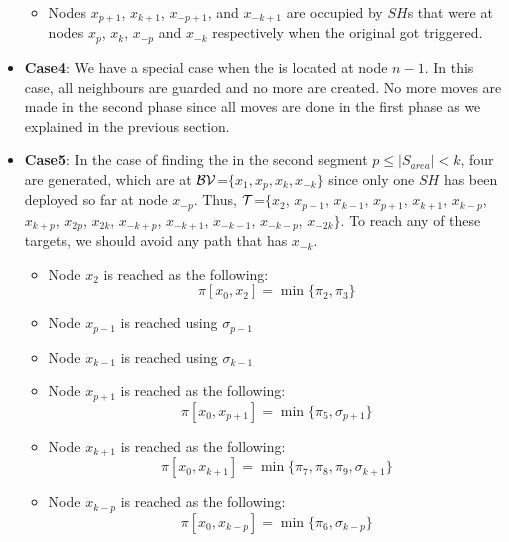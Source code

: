\begin{itemize}
\begin{itemize}
\item Nodes $x_{p+1}$, $x_{k+1}$, $x_{-p+1}$, and $x_{-k+1}$ are occupied by $SH$s that were at nodes $x_{p}$, $x_{k}$, $x_{-p}$ and $x_{-k}$ respectively when the original \bv got triggered. 
\end{itemize}


\item {\bf Case4}: We have a special case when the \bv is located at node $n-1$. In this case, all neighbours are guarded and no more \bvs are created. No more moves are made in the second phase since all moves are done in the first phase as we explained in the previous section.

\item {\bf Case5}: In the case of finding the \bv in the second segment $p\leq |S_{area}| <k$, four \bvs are generated, which are at $\cal BV$=$\{x_1,x_p,x_k,x_{-k}\}$ since only one $SH$ has been deployed so far at node $x_{-p}$. Thus,
$\cal T$=$\{x_{2}$, $x_{p-1}$,  $x_{k-1}$, $x_{p+1}$, $x_{k+1}$, $x_{k-p}$, $x_{k+p}$, $x_{2p}$, $x_{2k}$, $x_{-k+p}$, $x_{-k+1}$, $x_{-k-1}$, $x_{-k-p}$, $x_{-2k}\}$. To reach any of these targets, we should avoid any path that has $x_{-k}$.
\begin{itemize}
\item Node $x_{2}$ is reached as the following:  
$$ \pi[x_0,x_{2}] = \min \{ \pi_2,\pi_3\}$$

\item Node $x_{p-1}$ is reached using $\sigma_{p-1}$ 

\item Node $x_{k-1}$ is reached using $\sigma_{k-1}$ 

\item Node $x_{p+1}$ is reached as the following:  
$$ \pi[x_0,x_{p+1}] = \min \{ \pi_5,\sigma_{p+1}\}$$

\item Node $x_{k+1}$ is reached as the following:  
$$ \pi[x_0,x_{k+1}] = \min \{ \pi_7,\pi_8,\pi_9,\sigma_{k+1}\}$$

\item Node $x_{k-p}$ is reached as the following:  
$$ \pi[x_0,x_{k-p}] = \min \{ \pi_6,\sigma_{k-p}\}$$



\end{itemize}
\end{itemize}
